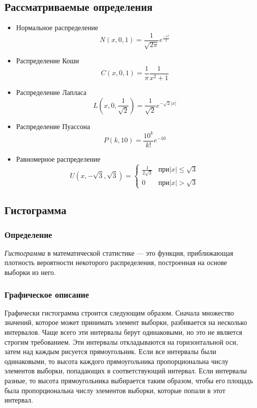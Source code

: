 \documentclass[main.tex]{subfiles}
\begin{document}
    \subsection{Рассматриваемые определения}
\begin{itemize}
		\item Нормальное распределение
		    \begin{equation}
		    	N(x, 0, 1) = \frac{1}{\sqrt{2\pi}}e^{\frac{-x^2}{2}} \label{norm} 
			\end{equation}
		\item Распределение Коши
		    \begin{equation}
				C(x, 0, 1) = \frac{1}{\pi}\frac{1}{x^2+1} \label{koshi}
			 \end{equation} 
		\item Распределение Лапласа
		    \begin{equation}
				 L(x, 0, \frac{1}{\sqrt{2}}) =\frac{1}{\sqrt{2}}e^{-\sqrt{2}|x|}\label{laplace}
			 \end{equation}
		\item Распределение Пуассона
	        \begin{equation}
				P(k, 10) = \frac{10^k}{k!}e^{-10}\label{puasson}
			\end{equation}
		\item Равномерное распределение 
		    \begin{equation}
				U(x, -\sqrt{3}, \sqrt{3}) =	\begin{cases}\frac{1}{2\sqrt{3}} 
				&\text{$при |x|\leq \sqrt{3}$}\\0 &\text{$при |x|>\sqrt{3}$}\end{cases}\label{uni} 
			\end{equation}
	\end{itemize}
	
	\subsection{Гистограмма}
	\subsubsection{Определение}
	\noindent \textit{Гистограмма} в математической статистике — это функция, приближающая плотность вероятности некоторого распределения, построенная на основе выборки из него.
	
	\subsubsection{Графическое описание}
	\noindent Графически гистограмма строится следующим образом. Сначала множество значений, которое может принимать элемент выборки, разбивается на несколько интервалов. Чаще всего эти интервалы берут одинаковыми, но это не является строгим требованием. Эти интервалы откладываются на горизонтальной оси, затем над каждым рисуется прямоугольник. Если все интервалы были одинаковыми, то высота каждого прямоугольника пропорциональна числу элементов выборки, попадающих в соответствующий интервал. Если интервалы разные, то высота прямоугольника выбирается таким образом, чтобы его площадь была пропорциональна числу элементов выборки, которые попали в этот интервал.
	
\end{document}
